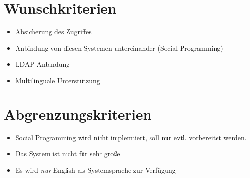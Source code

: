 \section{Wunschkriterien}

\begin{itemize}
\item  Absicherung des Zugriffes
\item  Anbindung von diesen Systemen untereinander (Social Programming)
\item  LDAP Anbindung
\item  Multilinguale Unterstützung
\end{itemize}

\section{Abgrenzungskriterien}

\begin{itemize}
\item  Social Programming wird nicht implemtiert, soll nur evtl. vorbereitet werden.
\item  Das System ist nicht für sehr große
\item  Es wird \emph{nur} English als Systemsprache zur Verfügung
\end{itemize}
